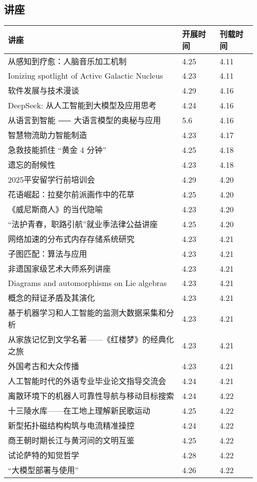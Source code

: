 \documentclass[letterpaper, 12pt]{article}
\begin{document}
\begin{multicols}{2}
\pagebreak

\section{讲座}
\begin{tabular}{|>{\centering\arraybackslash}m{}|m{}|m{}|}
    \hline
    讲座 & 开展时间 & 刊载时间\\
    \hline\hline
    从感知到疗愈：人脑音乐加工机制 & 4.25 & 4.11\\\hline
    Ionizing spotlight of Active Galactic Nucleus & 4.23 & 4.11\\\hline
    软件发展与技术漫谈 & 4.29 & 4.16\\\hline
    DeepSeek: 从人工智能到大模型及应用思考 & 4.24 & 4.16\\\hline
    从语言到智能 ⸺ 大语言模型的奥秘与应用 & 5.6 & 4.16\\\hline
    智慧物流助力智能制造 & 4.23 & 4.17\\\hline
    急救技能抓住 “黄金 4 分钟” & 4.25 & 4.18\\\hline
    遗忘的耐候性 & 4.23 & 4.18\\\hline
    2025平安留学行前培训会 & 4.29 & 4.20\\\hline
    花语崛起：拉斐尔前派画作中的花草 & 4.25 & 4.20\\\hline
    《威尼斯商人》的当代隐喻 & 4.23 & 4.20\\\hline
    “法护青春，职路引航”就业季法律公益讲座 & 4.25 & 4.20\\\hline
    网络加速的分布式内存存储系统研究 & 4.23 & 4.21\\\hline
    子图匹配：算法与应用 & 4.23 & 4.21\\\hline
    非遗国家级艺术大师系列讲座 & 4.23 & 4.21\\\hline
    Diagrams and automorphisms on Lie algebras & 4.23 & 4.21\\\hline
    概念的辩证矛盾及其演化 & 4.23 & 4.21\\\hline
    基于机器学习和人工智能的监测大数据采集和分析 & 4.23 & 4.21\\\hline
    从家族记忆到文学名著——《红楼梦》的经典化之旅 & 4.23 & 4.21\\\hline
    外国考古和大众传播 & 4.23 & 4.21\\\hline
    人工智能时代的外语专业毕业论文指导交流会 & 4.24 & 4.21\\\hline
    离散环境下的机器人可靠性导航与移动目标搜索 & 4.24 & 4.22\\\hline
    十三陵水库——在工地上理解新民歌运动 & 4.25 & 4.22\\\hline
    新型拓扑磁结构构筑与电流精准操控 & 4.24 & 4.22\\\hline
    商王朝时期长江与黄河间的文明互鉴 & 4.25 & 4.22\\\hline
    试论萨特的知觉哲学 & 4.28 & 4.22\\\hline
    “大模型部署与使用” & 4.26 & 4.22\\\hline
    

\end{tabular}
\end{multicols}
\end{document}
